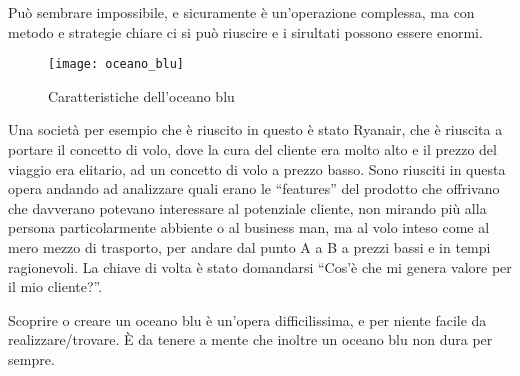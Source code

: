 Può sembrare impossibile, e sicuramente è un'operazione complessa, ma con
metodo e strategie chiare ci si può riuscire e i sirultati possono essere
enormi.

\begin{figure}[t]
 \centering
 \texttt{[image: oceano\_blu]}
 \caption{Caratteristiche dell'oceano blu}
 \label{fig:bmi:oceano_blu}
\end{figure}

Una società per esempio che è riuscito in questo è stato Ryanair, che è
riuscita a portare il concetto di volo, dove la cura del cliente era molto alto
e il prezzo del viaggio era elitario, ad un concetto di volo a prezzo basso.
Sono riusciti in questa opera andando ad analizzare quali erano le ``features''
del prodotto che offrivano che davverano potevano interessare al potenziale
cliente, non mirando più alla persona particolarmente abbiente o al business
man, ma al volo inteso come al mero mezzo di trasporto, per andare dal punto A
a B a prezzi bassi e in tempi ragionevoli. La chiave di volta è stato
domandarsi ``Cos'è che mi genera valore per il mio cliente?''.

Scoprire o creare un oceano blu è un'opera difficilissima, e per niente facile
da realizzare/trovare. È da tenere a mente che inoltre un oceano blu non dura
per sempre.
